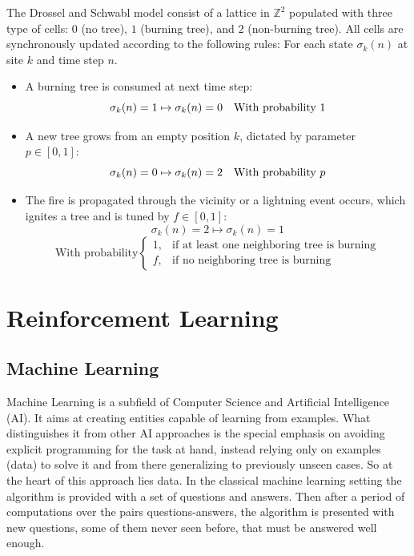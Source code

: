 \documentclass[
]{book}
\begin{document}
The Drossel and Schwabl model consist of a lattice in \(\mathds{Z}^2\) populated with three type of cells: \(0\) (no tree), \(1\) (burning tree), and \(2\) (non-burning tree). All cells are synchronously updated according to the following rules:
For each state \(\sigma_k(n)\) at site \(k\) and time step \(n\).

\begin{itemize}
\item
  A burning tree is consumed at next time step:
  \[\sigma_k(n) = 1 \mapsto  \sigma_k(n) = 0 \textrm{\quad With probability}\ 1\]
\item
  A new tree grows from an empty position \(k\), dictated by parameter \(p \in [0,1]:\)
  \[\sigma_k(n) = 0 \mapsto  \sigma_k(n) = 2 \textrm{\quad With probability}\ p\]
\item
  The fire is propagated through the vicinity or a lightning event occurs, which ignites a tree and is tuned by \(f \in [0,1]:\)
  \[\sigma_k(n) = 2 \mapsto  \sigma_k(n) = 1\]
  \[\textrm{With probability} \begin{cases}
  1, & \textrm{if at least one neighboring tree is burning}\\
  f, & \textrm{if no neighboring tree is burning}
  \end{cases}\]
\end{itemize}

\hypertarget{reinforcement-learning}{%
\chapter{Reinforcement Learning}\label{reinforcement-learning}}

\hypertarget{machine-learning}{%
\section{Machine Learning}\label{machine-learning}}

Machine Learning is a subfield of Computer Science and Artificial Intelligence (AI). It aims at creating entities capable of learning from examples. What distinguishes it from other AI approaches is the special emphasis on avoiding explicit programming for the task at hand, instead relying only on examples (data) to solve it and from there generalizing to previously unseen cases. So at the heart of this approach lies data. In the classical machine learning setting the algorithm is provided with a set of questions and answers. Then after a period of computations over the pairs questions-answers, the algorithm is presented with new questions, some of them never seen before, that must be answered well enough.
\end{document}
